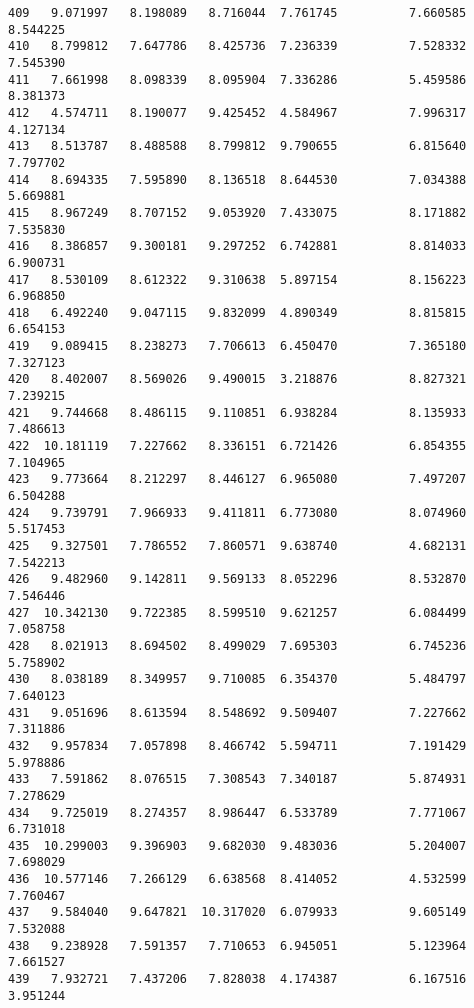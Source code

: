 \documentclass[11pt]{article}
\begin{document}
\begin{Verbatim}[commandchars=\\\{\}]
409   9.071997   8.198089   8.716044  7.761745          7.660585      8.544225
410   8.799812   7.647786   8.425736  7.236339          7.528332      7.545390
411   7.661998   8.098339   8.095904  7.336286          5.459586      8.381373
412   4.574711   8.190077   9.425452  4.584967          7.996317      4.127134
413   8.513787   8.488588   8.799812  9.790655          6.815640      7.797702
414   8.694335   7.595890   8.136518  8.644530          7.034388      5.669881
415   8.967249   8.707152   9.053920  7.433075          8.171882      7.535830
416   8.386857   9.300181   9.297252  6.742881          8.814033      6.900731
417   8.530109   8.612322   9.310638  5.897154          8.156223      6.968850
418   6.492240   9.047115   9.832099  4.890349          8.815815      6.654153
419   9.089415   8.238273   7.706613  6.450470          7.365180      7.327123
420   8.402007   8.569026   9.490015  3.218876          8.827321      7.239215
421   9.744668   8.486115   9.110851  6.938284          8.135933      7.486613
422  10.181119   7.227662   8.336151  6.721426          6.854355      7.104965
423   9.773664   8.212297   8.446127  6.965080          7.497207      6.504288
424   9.739791   7.966933   9.411811  6.773080          8.074960      5.517453
425   9.327501   7.786552   7.860571  9.638740          4.682131      7.542213
426   9.482960   9.142811   9.569133  8.052296          8.532870      7.546446
427  10.342130   9.722385   8.599510  9.621257          6.084499      7.058758
428   8.021913   8.694502   8.499029  7.695303          6.745236      5.758902
430   8.038189   8.349957   9.710085  6.354370          5.484797      7.640123
431   9.051696   8.613594   8.548692  9.509407          7.227662      7.311886
432   9.957834   7.057898   8.466742  5.594711          7.191429      5.978886
433   7.591862   8.076515   7.308543  7.340187          5.874931      7.278629
434   9.725019   8.274357   8.986447  6.533789          7.771067      6.731018
435  10.299003   9.396903   9.682030  9.483036          5.204007      7.698029
436  10.577146   7.266129   6.638568  8.414052          4.532599      7.760467
437   9.584040   9.647821  10.317020  6.079933          9.605149      7.532088
438   9.238928   7.591357   7.710653  6.945051          5.123964      7.661527
439   7.932721   7.437206   7.828038  4.174387          6.167516      3.951244


\end{Verbatim}
\end{document}
